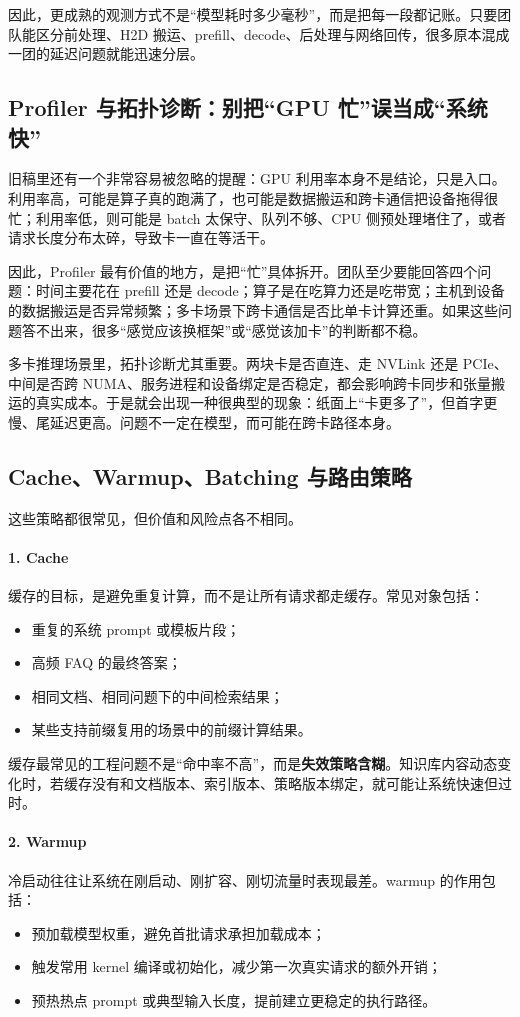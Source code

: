 因此，更成熟的观测方式不是“模型耗时多少毫秒”，而是把每一段都记账。只要团队能区分前处理、H2D 搬运、prefill、decode、后处理与网络回传，很多原本混成一团的延迟问题就能迅速分层。

\subsection{Profiler 与拓扑诊断：别把“GPU 忙”误当成“系统快”}
旧稿里还有一个非常容易被忽略的提醒：GPU 利用率本身不是结论，只是入口。利用率高，可能是算子真的跑满了，也可能是数据搬运和跨卡通信把设备拖得很忙；利用率低，则可能是 batch 太保守、队列不够、CPU 侧预处理堵住了，或者请求长度分布太碎，导致卡一直在等活干。

因此，Profiler 最有价值的地方，是把“忙”具体拆开。团队至少要能回答四个问题：时间主要花在 prefill 还是 decode；算子是在吃算力还是吃带宽；主机到设备的数据搬运是否异常频繁；多卡场景下跨卡通信是否比单卡计算还重。如果这些问题答不出来，很多“感觉应该换框架”或“感觉该加卡”的判断都不稳。

多卡推理场景里，拓扑诊断尤其重要。两块卡是否直连、走 NVLink 还是 PCIe、中间是否跨 NUMA、服务进程和设备绑定是否稳定，都会影响跨卡同步和张量搬运的真实成本。于是就会出现一种很典型的现象：纸面上“卡更多了”，但首字更慢、尾延迟更高。问题不一定在模型，而可能在跨卡路径本身。

\subsection{Cache、Warmup、Batching 与路由策略}
这些策略都很常见，但价值和风险点各不相同。

\paragraph{1. Cache}
缓存的目标，是避免重复计算，而不是让所有请求都走缓存。常见对象包括：
\begin{itemize}
  \item 重复的系统 prompt 或模板片段；
  \item 高频 FAQ 的最终答案；
  \item 相同文档、相同问题下的中间检索结果；
  \item 某些支持前缀复用的场景中的前缀计算结果。
\end{itemize}

缓存最常见的工程问题不是“命中率不高”，而是\textbf{失效策略含糊}。知识库内容动态变化时，若缓存没有和文档版本、索引版本、策略版本绑定，就可能让系统快速但过时。

\paragraph{2. Warmup}
冷启动往往让系统在刚启动、刚扩容、刚切流量时表现最差。warmup 的作用包括：
\begin{itemize}
  \item 预加载模型权重，避免首批请求承担加载成本；
  \item 触发常用 kernel 编译或初始化，减少第一次真实请求的额外开销；
  \item 预热热点 prompt 或典型输入长度，提前建立更稳定的执行路径。
\end{itemize}

